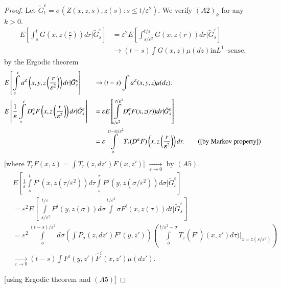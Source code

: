 \begin{proof}
  Let $\tilde{G}^\varepsilon_t= \sigma(Z(x,z,s),z(s):s \le t/\varepsilon^2)$. We
  verify $(A2)_k$ for any $k>0$. 
  \begin{align*}
    E\left[ \int ^t_s G\left(x, z\left(\frac{r}{\varepsilon}\right)\right)dr
      |\tilde {G}^ \varepsilon _s\right]
    & = \varepsilon^2 E\left[\int ^{t/ \varepsilon}_{s/
        \varepsilon^2}G(x,z(r))dr |\tilde{G}^ 
      \varepsilon _s\right]\\ 
    & \to (t-s) \int G(x,z)\mu (dz) \text{in} L^1 ~\text{-sense,}
  \end{align*}
  by the Ergodic theorem
\begin{alignat*}{3}
& E \left[ \int\limits^t_s
    a^Z \left(x,y,z \left(\frac{r}{\varepsilon^2}\right)\right)dr
    |\tilde{G}^\varepsilon_s\right]&&\to  
  (t-s)\int  a^Z (x,y,z) \mu (dz). \\
    & E \left[\frac{1}{\varepsilon} \int\limits^t_s D^\alpha_x
      F\left(x,z\left(\frac{r}{\varepsilon^2}\right)\right)dr 
      |\tilde{G}^\varepsilon_s\right]& &= \varepsilon E
  \left[\int\limits^{t/\varepsilon^2}_{s/ \varepsilon^2} D^\alpha_x
    F(x,z(r))dr |\tilde{G}^\varepsilon_s\right]\\  
    &&&=\varepsilon \int\limits^{(t-s)/ \varepsilon^2}_o T_r(D^\alpha
    F) \left(x,z\left(\frac{r}{\varepsilon^2}\right)\right)dr. \tag{{[by
          Markov property]}}
\end{alignat*}
      [where $T_r F(x,z) = \int T_r(z,dz')F(x,z')$] $\xrightarrow[\varepsilon
        \to 0]{}$ by $(A5)$.\pageoriginale 
\begin{align*}
  &E \left[\frac{1}{\varepsilon}\int\limits^t_s F^i (x,z(\tau
    /\varepsilon^2))d \tau \int\limits^\tau_s F^j (y,z(\sigma
    /\varepsilon^2))d \sigma | 
    \tilde{G}^\varepsilon _s\right]\\  
  & = \varepsilon^2 E \left[\int\limits^{t/ \varepsilon}_{\;s/
      \varepsilon^2} F^j (y,z (\sigma))d 
    \sigma \int\limits^{t/ \varepsilon^2}{\sigma} F^i(x,z(\tau))dt |
    \tilde{G}^\varepsilon_s\right]\\   
  & = \varepsilon^2 \int\limits^{(t-s)/ \varepsilon^2}_o d \sigma
  \left(\int\limits P_\sigma (z,dz')F^j 
  (y,z')\right) \left(\int\limits^{t/ \varepsilon^2 -\sigma}_o T_\tau 
  (F^i)(x,z')d \tau) |_{z=z(s/ \varepsilon^2)}\right)\\ 
  & \xrightarrow[\varepsilon \to 0]{}  (t-s)\int\limits F^j(y,z')
  \hat{F}^i   (x,z') \mu (dz'). 
\end{align*}

\hfill {[using Ergodic theorem and $(A5)$]}
\end{proof}

